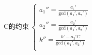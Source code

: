 \documentclass[preview]{standalone}
\begin{document}
\begin{align*}
\text{C的约束}~\begin{cases}a_1'' = \frac{a_1'}{\mathrm{gcd}(a_1', a_2')} \\a_2'' = \frac{a_2'}{\mathrm{gcd}(a_1', a_2')} \\k'' = \frac{k' - a_3' C}{\mathrm{gcd}(a_1', a_2')} \\\end{cases}
\end{align*}
\end{document}
